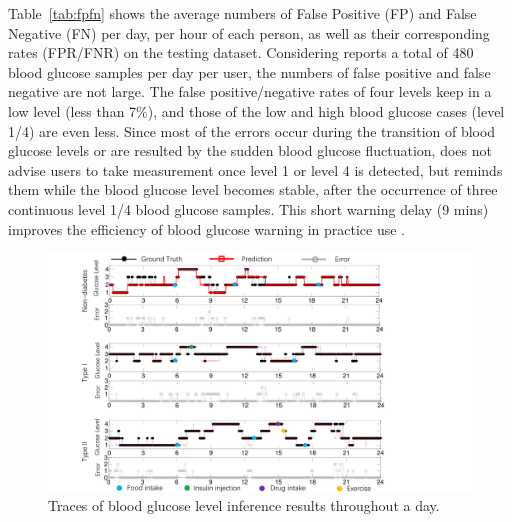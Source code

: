 \textcolor[rgb]{1.00,0.00,0.00}{Table~\ref{tab:fpfn} shows the average numbers of False Positive (FP) and False Negative (FN) per day, per hour of each person, as well as their corresponding rates (FPR/FNR) on the testing dataset. Considering \sysname reports a total of 480 blood glucose samples per day per user, the numbers of false positive and false negative are not large.
The false positive/negative rates of four levels keep in a low level (less than 7\%), and those of the low and high blood glucose cases (level 1/4) are even less.  Since most of the errors occur during the transition of blood glucose levels or are resulted by the sudden blood glucose fluctuation, \sysname does not advise users to take measurement once level 1 or level 4 is detected, but reminds them while the blood glucose level becomes stable, \ie after the occurrence of three continuous level 1/4 blood glucose samples. This short warning delay (9 mins) improves the efficiency of blood glucose warning in practice use \cite{bib:Low_Blood_Glucose_(Hypoglycemia),bib:whitmer2009hypoglycemic}.}





\begin{figure}[h]
  \centering
  \includegraphics[width=0.8\columnwidth]{./img/pred_vs_gt2.pdf}
  \caption{Traces of blood glucose level inference results throughout a day.}
  \label{fig:pre_gt}
\end{figure}

